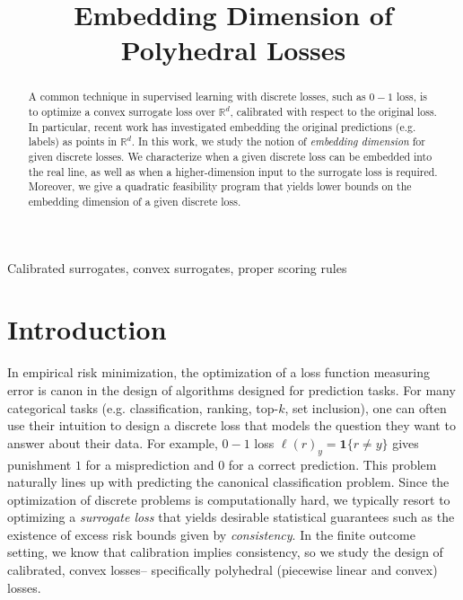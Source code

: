 \documentclass[anon]{colt2020} %
\title[Embedding dimension]{Embedding Dimension of Polyhedral Losses}
\newcommand{\reals}{\mathbb{R}}
\newcommand{\Ind}[1]{\mathbf{1}\{#1\}}
\begin{document}
\maketitle

\begin{abstract}%
  A common technique in supervised learning with discrete losses, such as $0-1$ loss, is to optimize a convex surrogate loss over $\reals^d$, calibrated with respect to the original loss.
  In particular, recent work has investigated embedding the original predictions (e.g. labels) as points in $\reals^d$.
  In this work, we study the notion of \emph{embedding dimension} for given discrete losses.
  We characterize when a given discrete loss can be embedded into the real line, as well as when a higher-dimension input to the surrogate loss is required.
  Moreover, we give a quadratic feasibility program that yields lower bounds on the embedding dimension of a given discrete loss.
\end{abstract}

\begin{keywords}%
  Calibrated surrogates, convex surrogates, proper scoring rules%
\end{keywords}


\section{Introduction}
In empirical risk minimization, the optimization of a loss function measuring error is canon in the design of algorithms designed for prediction tasks.
For many categorical tasks (e.g. classification, ranking, top-$k$, set inclusion), one can often use their intuition to design a discrete loss that models the question they want to answer about their data.
For example, $0-1$ loss $\ell(r)_y = \Ind{r \neq y}$ gives punishment $1$ for a misprediction and $0$ for a correct prediction.
This problem naturally lines up with predicting the canonical classification problem.
Since the optimization of discrete problems is computationally hard, we typically resort to optimizing a \emph{surrogate loss} that yields desirable statistical guarantees such as the existence of excess risk bounds given by \emph{consistency}.
In the finite outcome setting, we know that calibration implies consistency, so we study the design of calibrated, convex losses-- specifically polyhedral (piecewise linear and convex) losses.
\end{document}
